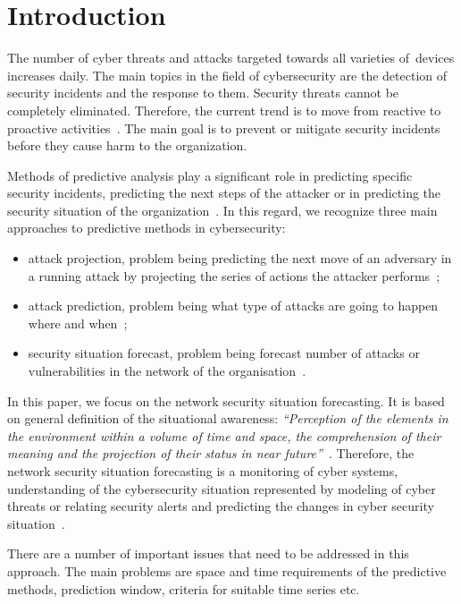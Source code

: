 \documentclass[runningheads]{llncs}
\begin{document}
\section{Introduction}

The number of cyber threats and attacks targeted towards all varieties of~devices increases daily. The main topics in the field of cybersecurity are the detection of security incidents and the response to them. Security threats cannot be completely eliminated. Therefore, the current trend is to move from reactive to proactive activities~\cite{cho2020toward}. The main goal is to prevent or mitigate security incidents before they cause harm to the organization. 

Methods of predictive analysis play a significant role in predicting specific security incidents, predicting the next steps of the attacker or in predicting the security situation of the organization~\cite{Husak2018survey}. In this regard, we recognize three main approaches to predictive methods in cybersecurity:
\begin {itemize}
 \item attack projection, problem being predicting the next move of an adversary in a running attack by projecting the series of actions the attacker performs~\cite{Yang2014};
 \item attack prediction, problem being what type of attacks are going to happen where and when~\cite{Abdlhamed2017};
 \item security situation forecast, problem being forecast number of attacks or vulnerabilities in the network of the organisation~\cite{Leau2015}.
\end {itemize}

In this paper, we focus on the network security situation forecasting. It is based on general definition of the situational awareness: \emph{``Perception of the elements in the environment within a volume of time and space, the comprehension of their meaning and the projection of their status in near future''}~\cite{Endsley1988}. Therefore, the network security situation forecasting is a monitoring of cyber systems, understanding of the cybersecurity situation represented by modeling of cyber threats or relating security alerts and predicting the changes in cyber security situation~\cite{Husak2018survey}.  

There are a number of important issues that need to be addressed in this approach. The main problems are space and time requirements of the predictive methods, prediction window, criteria for suitable time series etc. %
\end{document}
